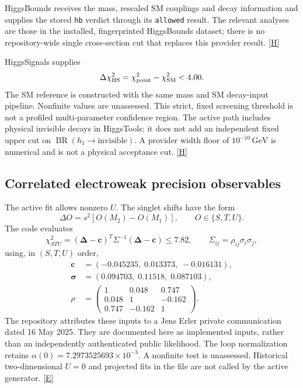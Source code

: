 \documentclass[11pt,a4paper]{article}
\newcommand{\code}[1]{\ifmmode\mbox{\ttfamily\detokenize{#1}}\else\nolinkurl{#1}\fi}
\newcommand{\src}[1]{\hyperlink{src:#1}{\textsf{[#1]}}}
\newcommand{\GeV}{\,\mathrm{GeV}}
\newcommand{\BR}{\operatorname{BR}}
\begin{document}
HiggsBounds receives the mass, rescaled SM couplings and decay information
and supplies the stored \code{hb} verdict through its \code{allowed}
result. The relevant analyses are those in the installed, fingerprinted
HiggsBounds dataset; there is no repository-wide single cross-section cut
that replaces this provider result. \src{H}

HiggsSignals supplies
\begin{equation}
 \Delta\chi^2_{\rm HS}=\chi^2_{\rm point}-\chi^2_{\rm SM}<4.00.
 \label{eq:hs}
\end{equation}
The SM reference is constructed with the same mass and SM decay-input
pipeline. Nonfinite values are unassessed. This strict, fixed screening
threshold is not a profiled multi-parameter confidence region.
The active path includes physical invisible decays in HiggsTools; it does
not add an independent fixed upper cut on $\BR(h_1\to\mathrm{invisible})$.
A provider width floor of $10^{-10}\GeV$ is numerical and is not a
physical acceptance cut. \src{H}

\subsection{Correlated electroweak precision observables}
The active fit allows nonzero $U$. The singlet shifts have the form
\begin{equation}
 \Delta O=s^2[O(M_2)-O(M_1)],\qquad O\in\{S,T,U\}.
\end{equation}
The code evaluates
\begin{equation}
 \chi^2_{STU}=(\boldsymbol\Delta-\boldsymbol c)^T
 \Sigma^{-1}(\boldsymbol\Delta-\boldsymbol c)\le7.82,
 \qquad \Sigma_{ij}=\rho_{ij}\sigma_i\sigma_j,
\end{equation}
using, in $(S,T,U)$ order,
\begin{align}
 \boldsymbol c&=(-0.045235,\;0.013373,\;-0.016131),\nonumber\\
 \boldsymbol\sigma&=(0.094703,\;0.11518,\;0.087103),\nonumber\\
 \rho&=\begin{pmatrix}1&0.048&0.747\\0.048&1&-0.162\\0.747&-0.162&1\end{pmatrix}.
\end{align}
The repository attributes these inputs to a Jens Erler private communication
dated 16 May 2025. They are documented here as implemented inputs, rather
than an independently authenticated public likelihood. The loop normalization
retains $\alpha(0)=7.2973525693\times10^{-3}$. A nonfinite test is
unassessed. Historical two-dimensional $U=0$ and projected fits in the
file are not called by the active generator. \src{E}
\end{document}
